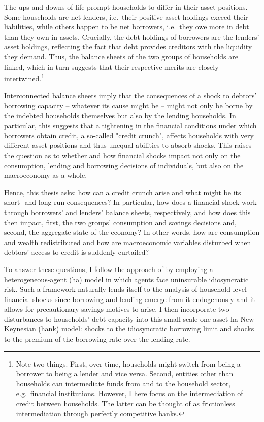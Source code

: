 \documentclass[a4paper,12pt]{article} %
\numberwithin{equation}{section} %
\numberwithin{figure}{section}
\numberwithin{table}{section}
\begin{document}
The ups and downs of life prompt households to differ in their asset positions. Some households are net lenders, i.e.~their positive asset holdings exceed their liabilities, while others happen to be net borrowers, i.e.~they owe more in debt than they own in assets. Crucially, the debt holdings of borrowers are the lenders' asset holdings, reflecting the fact that debt provides creditors with the liquidity they demand. Thus, the balance sheets of the two groups of households are linked, which in turn suggests that their respective merits are closely intertwined.\footnote{Note two things. First, over time, households might switch from being a borrower to being a lender and vice versa. Second, entities other than households can intermediate funds from and to the household sector, e.g.~financial institutions. However, I here focus on the intermediation of credit between households. The latter can be thought of as frictionless intermediation through perfectly competitive banks.} 

Interconnected balance sheets imply that the consequences of a shock to debtors' borrowing capacity -- whatever its cause might be -- might not only be borne by the indebted households themselves but also by the lending households. In particular, this suggests that a tightening in the financial conditions under which borrowers obtain credit, a so-called "credit crunch", affects households with very different asset positions and thus unequal abilities to absorb shocks. This raises the question as to whether and how financial shocks impact not only on the consumption, lending and borrowing decisions of individuals, but also on the macroeconomy as a whole. 

Hence, this thesis asks: how can a credit crunch arise and what might be its short- and long-run consequences? In particular, how does a financial shock work through borrowers' and lenders' balance sheets, respectively, and how does this then impact, first, the two groups' consumption and savings decisions and, second, the aggregate state of the economy? In other words, how are consumption and wealth redistributed and how are macroeconomic variables disturbed when debtors' access to credit is suddenly curtailed?

To answer these questions, I follow the approach of \textcite{gl2017} by employing a heterogeneous-agent (\Gls{ha}) model in which agents face uninsurable idiosyncratic risk. Such a framework naturally lends itself to the analysis of household-level financial shocks since borrowing and lending emerge from it endogenously and it allows for precautionary-savings motives to arise. I then incorporate two disturbances to households' debt capacity into this small-scale one-asset \Gls{ha} New Keynesian (\Gls{hank}) model: shocks to the idiosyncratic borrowing limit and shocks to the premium of the borrowing rate over the lending rate.
\end{document}
